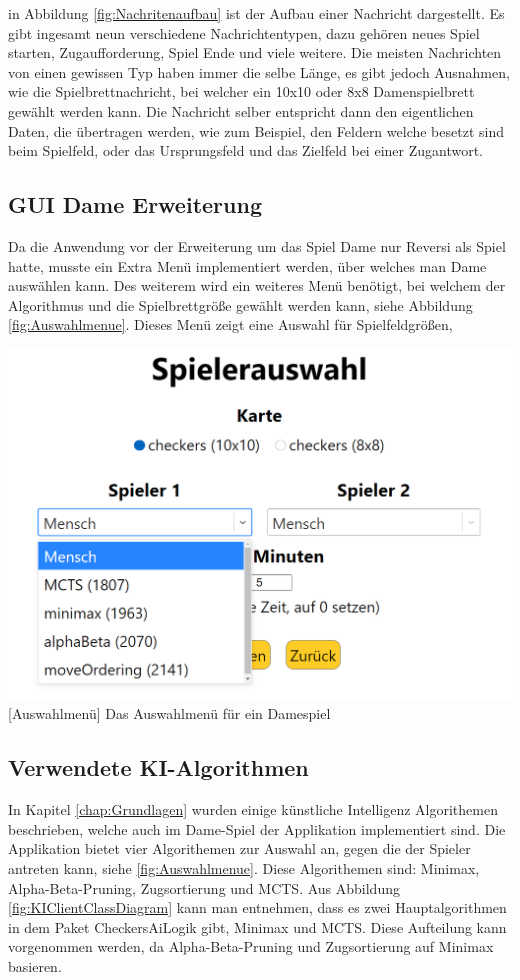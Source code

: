 \documentclass[12pt,a4paper,bibliography=totocnumbered,listof=totocnumbered]{article}
\begin{document}
in Abbildung \ref{fig:Nachritenaufbau} ist der Aufbau einer Nachricht dargestellt. Es gibt ingesamt neun verschiedene Nachrichtentypen, dazu gehören 
neues Spiel starten, Zugaufforderung, Spiel Ende und viele weitere. Die meisten Nachrichten von einen gewissen Typ haben immer die selbe Länge, es gibt jedoch
Ausnahmen, wie die Spielbrettnachricht, bei welcher ein 10x10 oder 8x8 Damenspielbrett gewählt werden kann. Die Nachricht selber entspricht dann den eigentlichen 
Daten, die übertragen werden, wie zum Beispiel, den Feldern welche besetzt sind beim Spielfeld, oder das Ursprungsfeld und das Zielfeld bei einer Zugantwort. 

\subsection{GUI Dame Erweiterung}
Da die Anwendung vor der Erweiterung um das Spiel Dame nur Reversi als Spiel hatte, musste ein Extra Menü implementiert werden, über welches man Dame auswählen kann.
Des weiterem wird ein weiteres Menü benötigt, bei welchem der Algorithmus und die Spielbrettgröße gewählt werden kann, siehe Abbildung \ref{fig:Auswahlmenue}.
Dieses Menü zeigt eine Auswahl für Spielfeldgrößen, 

\vspace{1em}
\begin{minipage}{\linewidth}
	\centering
	\includegraphics[width=0.7\linewidth]{pics/AlgorithmeninderApplikation.png}
	[Auswahlmenü]{ Das Auswahlmenü für ein Damespiel }
	\label{fig:Auswahlmenue}
\end{minipage}

\subsection{Verwendete KI-Algorithmen}
In Kapitel \ref{chap:Grundlagen} wurden einige künstliche Intelligenz Algorithemen beschrieben, welche auch im Dame-Spiel der Applikation implementiert sind.
Die Applikation bietet vier Algorithemen zur Auswahl an, gegen die der Spieler antreten kann, siehe \ref{fig:Auswahlmenue}. 
Diese Algorithemen sind: Minimax, Alpha-Beta-Pruning, Zugsortierung und MCTS.
Aus Abbildung \ref{fig:KIClientClassDiagram}
kann man entnehmen, dass es zwei Hauptalgorithmen in dem Paket CheckersAiLogik gibt, Minimax und MCTS. Diese Aufteilung kann vorgenommen werden,
da Alpha-Beta-Pruning und Zugsortierung auf Minimax basieren.
\end{document}

